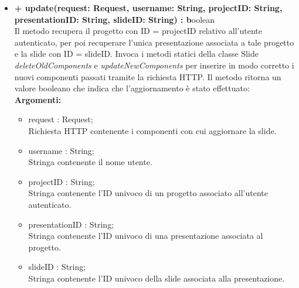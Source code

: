 \begin{itemize}
			\item \textbf{+ update(request: Request, username: String, projectID: String, presentationID: String, slideID: String) : b}oolean\\
				Il metodo recupera il progetto con ID = projectID relativo all'utente autenticato, per poi recuperare l'unica presentazione associata a tale progetto e la \gls{slide} con ID = slideID. Invoca i metodi statici della classe \gls{Slide} \textit{deleteOldComponents} e \textit{updateNewComponents} per inserire in modo corretto i nuovi componenti passati tramite la richiesta HTTP. Il metodo ritorna un valore booleano che indica che l'aggiornamento è stato effettuato:\\
					\textbf{Argomenti:}
					\begin{itemize}
						\item request : Request;\\
						Richiesta HTTP contenente i componenti con cui aggiornare la \gls{slide}.
						\item username : String; \\
						Stringa contenente il nome utente.
						\item projectID : String; \\
						Stringa contenente l'ID univoco di un progetto associato all'utente autenticato.
						\item presentationID : String; \\
						Stringa contenente l'ID univoco di una presentazione associata al progetto.
						\item slideID : String; \\
						Stringa contenente l'ID univoco della \gls{slide} associata alla presentazione.
					\end{itemize}
					

\end{itemize}
